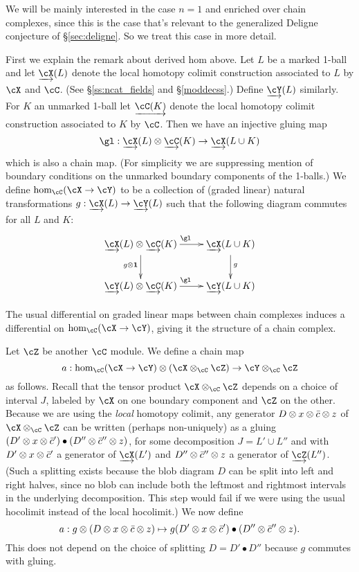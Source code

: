 We will be mainly interested in the case $n=1$ and enriched over chain complexes,
since this is the case that's relevant to the generalized Deligne conjecture of \S\ref{sec:deligne}.
So we treat this case in more detail.

First we explain the remark about derived hom above.
Let $L$ be a marked 1-ball and let $\cl{\cX}(L)$ denote the local homotopy colimit construction
associated to $L$ by $\cX$ and $\cC$.
(See \S \ref{ss:ncat_fields} and \S \ref{moddecss}.)
Define $\cl{\cY}(L)$ similarly.
For $K$ an unmarked 1-ball let $\cl{\cC(K)}$ denote the local homotopy colimit
construction associated to $K$ by $\cC$.
Then we have an injective gluing map
\[
	\gl: \cl{\cX}(L) \ot \cl{\cC}(K) \to \cl{\cX}(L\cup K) 
\]
which is also a chain map.
(For simplicity we are suppressing mention of boundary conditions on the unmarked 
boundary components of the 1-balls.)
We define $\hom_\cC(\cX \to \cY)$ to be a collection of (graded linear) natural transformations
$g: \cl{\cX}(L)\to \cl{\cY}(L)$ such that the following diagram commutes for all $L$ and $K$:
\[ \xymatrix{
	\cl{\cX}(L) \ot \cl{\cC}(K) \ar[r]^{\gl} \ar[d]_{g\ot \id} & \cl{\cX}(L\cup K) \ar[d]^{g}\\
	\cl{\cY}(L) \ot \cl{\cC}(K) \ar[r]^{\gl} & \cl{\cY}(L\cup K)
} \]

The usual differential on graded linear maps between chain complexes induces a differential
on $\hom_\cC(\cX \to \cY)$, giving it the structure of a chain complex.

Let $\cZ$ be another $\cC$ module.
We define a chain map
\[
	a: \hom_\cC(\cX \to \cY) \ot (\cX \ot_\cC \cZ) \to \cY \ot_\cC \cZ
\]
as follows.
Recall that the tensor product $\cX \ot_\cC \cZ$  depends on a choice of interval $J$, labeled
by $\cX$ on one boundary component and $\cZ$ on the other.
Because we are using the {\it local} homotopy colimit, any generator
$D\otimes x\otimes \bar{c}\otimes z$ of $\cX \ot_\cC \cZ$ can be written (perhaps non-uniquely) as a gluing
$(D'\otimes x \otimes \bar{c}') \bullet (D''\otimes \bar{c}''\otimes z)$, for some decomposition $J = L'\cup L''$
and with $D'\otimes x \otimes \bar{c}'$ a generator of $\cl{\cX}(L')$ and 
$D''\otimes \bar{c}''\otimes z$ a generator of $\cl{\cZ}(L'')$.
(Such a splitting exists because the blob diagram $D$ can be split into left and right halves, 
since no blob can include both the leftmost and rightmost intervals in the underlying decomposition.
This step would fail if we were using the usual hocolimit instead of the local hocolimit.)
We now define
\[
	a: g\otimes (D\otimes x\otimes \bar{c}\otimes z) \mapsto g(D'\otimes x \otimes \bar{c}')\bullet (D''\otimes \bar{c}''\otimes z) .
\]
This does not depend on the choice of splitting $D = D'\bullet D''$ because $g$ commutes with gluing.




